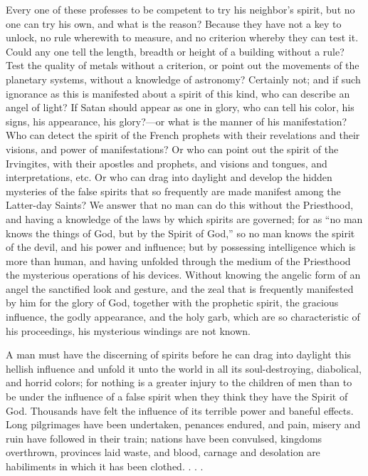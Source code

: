 Every one of these professes to be competent to try his neighbor's spirit, but no one can try
his own, and what is the reason? Because they have not a key to unlock, no rule wherewith to
measure, and no criterion whereby they can test it. Could any one tell the length, breadth or
height of a building without a rule? Test the quality of metals without a criterion, or point out
the movements of the planetary systems, without a knowledge of astronomy? Certainly not;
and if such ignorance as this is manifested about a spirit of this kind, who can describe an
angel of light? If Satan should appear as one in glory, who can tell his color, his signs, his
appearance, his glory?—or what is the manner of his manifestation? Who can detect the
spirit of the French prophets with their revelations and their visions, and power of
manifestations? Or who can point out the spirit of the Irvingites, with their apostles and
prophets, and visions and tongues, and interpretations, etc. Or who can drag into daylight and
develop the hidden mysteries of the false spirits that so frequently are made manifest among
the Latter-day Saints? We answer that no man can do this without the Priesthood, and having
a knowledge of the laws by which spirits are governed; for as ``no man knows the things of
God, but by the Spirit of God,'' so no man knows the spirit of the devil, and his power and
influence; but by possessing intelligence which is more than human, and having unfolded
through the medium of the Priesthood the mysterious operations of his devices. Without
knowing the angelic form of an angel the sanctified look and gesture, and the zeal that is
frequently manifested by him for the glory of God, together with the prophetic spirit, the
gracious influence, the godly appearance, and the holy garb, which are so characteristic of his
proceedings, his mysterious windings are not known.

A man must have the discerning of spirits before he can drag into daylight this hellish
influence and unfold it unto the world in all its soul-destroying, diabolical, and horrid colors;
for nothing is a greater injury to the children of men than to be under the influence of a false
spirit when they think they have the Spirit of God. Thousands have felt the influence of its
terrible power and baneful effects. Long pilgrimages have been undertaken, penances
endured, and pain, misery and ruin have followed in their train; nations have been convulsed,
kingdoms overthrown, provinces laid waste, and blood, carnage and desolation are
habiliments in which it has been clothed. . . .

